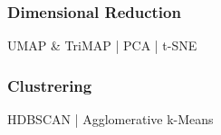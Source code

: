 \subsubsection{Dimensional Reduction}
UMAP \& TriMAP | PCA | t-SNE

\subsubsection{Clustrering}
HDBSCAN | Agglomerative k-Means